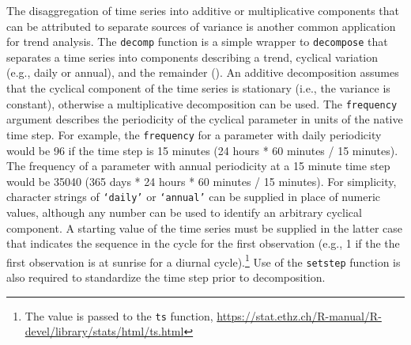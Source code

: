 \documentclass[10pt,letterpaper]{article}\usepackage[]{graphicx}\usepackage[]{color}
\begin{document}
The disaggregation of time series into additive or multiplicative components that can be attributed to separate sources of variance is another common application for trend analysis.  The \texttt{decomp} function is a simple wrapper to \texttt{decompose} \cite{Kendall83} that separates a time series into components describing a trend, cyclical variation (e.g., daily or annual), and the remainder  ().  An additive decomposition assumes that the cyclical component of the time series is stationary (i.e., the variance is constant), otherwise a multiplicative decomposition can be used.  The \texttt{frequency} argument describes the periodicity of the cyclical parameter in units of the native time step.  For example, the \texttt{frequency} for a parameter with daily periodicity would be 96 if the time step is 15 minutes (24 hours * 60 minutes / 15 minutes).  The frequency of a parameter with annual periodicity at a 15 minute time step would be 35040 (365 days * 24 hours * 60 minutes / 15 minutes).  For simplicity, character strings of \texttt{`daily'} or \texttt{`annual'} can be supplied in place of numeric values, although any number can be used to identify an arbitrary cyclical component.  A starting value of the time series must be supplied in the latter case that indicates the sequence in the cycle for the first observation (e.g., 1 if the the first observation is at sunrise for a diurnal cycle).\footnote{The value is passed to the \texttt{ts} function, \url{https://stat.ethz.ch/R-manual/R-devel/library/stats/html/ts.html}}  Use of the \texttt{setstep} function is also required to standardize the time step prior to decomposition.
\end{document}
